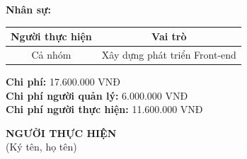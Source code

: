 {\begin{minipage}{\textwidth}
    \vspace{0.5cm}
    \noindent \textbf{Nhân sự:}
    \begin{longtable}{|c|c|}
    \hline
    \textbf{Người thực hiện} & \textbf{Vai trò} \\
    \hline
    Cả nhóm & Xây dựng phát triển Front-end \\
    \hline
    \end{longtable}
    \vspace{0.5cm}
    \noindent \textbf{Chi phí:} 17.600.000 VNĐ \\
    \noindent \textbf{Chi phí người quản lý:} 6.000.000 VNĐ \\
    \noindent \textbf{Chi phí người thực hiện:} 11.600.000 VNĐ \\
    \vspace{1cm}
    \begin{flushleft}
        \hspace{8cm} \textbf{NGƯỜI THỰC HIỆN} \\
        \hspace{8.8cm} (Ký tên, họ tên) \\
        \vspace{1cm}
    \end{flushleft}
    \end{minipage}
}
% 
